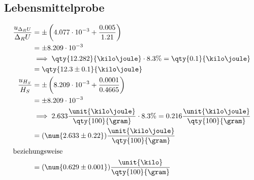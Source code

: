 \subsection{Lebensmittelprobe}
\begin{align*}
    \frac{u_{\Delta_R U}}{\Delta_R U} &= \pm \left( 4.077 \cdot 10^{-3} + \frac{0.005}{1.21} \right) \\
                                      &= \pm 8.209 \cdot 10^{-3} \\
                                      &\implies \qty{12.282}{\kilo\joule} \cdot 8.3\% = \qty{0.1}{\kilo\joule} \\
                                      &= \qty{12.3 \pm 0.1}{\kilo\joule} \\
    \frac{u_{H_S}}{H_S} &= \pm \left( 8.209 \cdot 10^{-3} + \frac{0.0001}{0.4665} \right) \\
                        &= \pm 8.209 \cdot 10^{-3} \\
                        &\implies 2.633 \frac{\unit{\kilo\joule}}{\qty{100}{\gram}} \cdot 8.3\% = 0.216 \frac{\unit{\kilo\joule}}{\qty{100}{\gram}} \\
                        &= (\num{2.633 \pm 0.22}) \frac{\unit{\kilo\joule}}{\qty{100}{\gram}} \\
                \intertext{beziehungsweise}
                        &= (\num{0.629 \pm 0.001}) \frac{\unit{\kilo\cal}}{\qty{100}{\gram}} 
\end{align*}
                           


